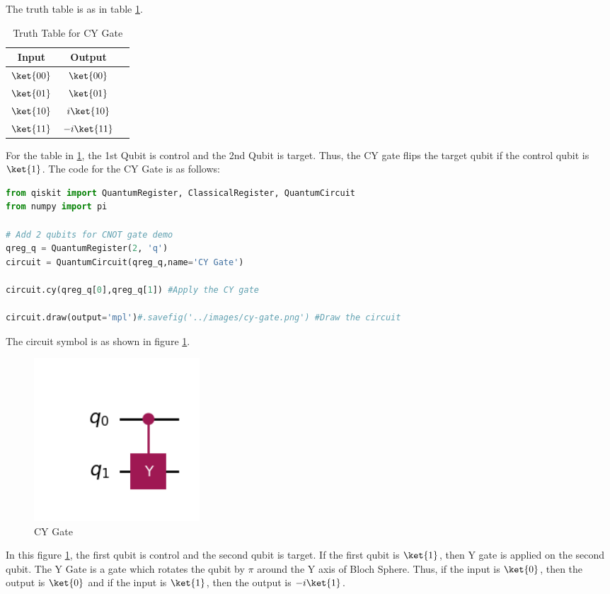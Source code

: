 \documentclass[12pt, oneside]{book}
\theoremstyle{definition}
\theoremstyle{definition}
\theoremstyle{remark}
\begin{document}
The truth table is as in table \ref{tab:cy}.
\begin{table}[H]
    \centering
    \begin{tabular}{|c|c|c|}
        \hline
        Input & Output\\
        \hline
        $\ket{00}$ & $\ket{00}$\\
        $\ket{01}$   & $\ket{01}$\\
        $\ket{10}$   & $i\ket{10}$\\
        $\ket{11}$  & $-i\ket{11}$\\
        \hline
    \end{tabular}
    \caption{Truth Table for CY Gate}
    \label{tab:cy}
\end{table}
For the table in \ref{tab:cy}, the 1st Qubit is control and the 2nd Qubit is target.
Thus, the CY gate flips the target qubit if the control qubit is $\ket{1}$.
The code for the CY Gate is as follows:
\begin{lstlisting}[language=Python]
from qiskit import QuantumRegister, ClassicalRegister, QuantumCircuit
from numpy import pi

# Add 2 qubits for CNOT gate demo
qreg_q = QuantumRegister(2, 'q')
circuit = QuantumCircuit(qreg_q,name='CY Gate')

circuit.cy(qreg_q[0],qreg_q[1]) #Apply the CY gate

circuit.draw(output='mpl')#.savefig('../images/cy-gate.png') #Draw the circuit
\end{lstlisting}

The circuit symbol is as shown in figure \ref{fig:cy}.
\begin{figure}[H]
    \centering
    \includegraphics[width=0.3\textwidth]{../images/cy-gate.png}
    \caption{CY Gate}
    \label{fig:cy}
\end{figure}
In this figure \ref{fig:cy}, the first qubit is control and the second qubit is target.
If the first qubit is $\ket{1}$, then Y gate is applied on the second qubit. The Y Gate
is a gate which rotates the qubit by $\pi$ around the Y axis of Bloch Sphere. Thus, if
the input is $\ket{0}$, then the output is $\ket{0}$ and if the input is $\ket{1}$, then the output is $-i\ket{1}$.
\end{document}
